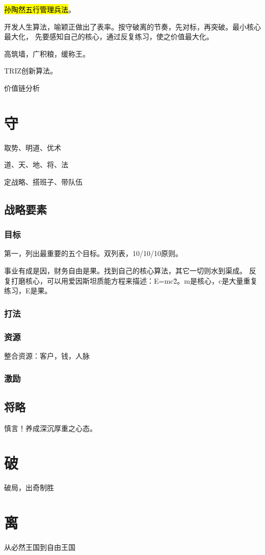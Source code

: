 \hl{孙陶然五行管理兵法}。

开发人生算法，喻颖正做出了表率。按守破离的节奏，先对标，再突破。最小核心最大化，
先要感知自己的核心，通过反复练习，使之价值最大化。

高筑墙，广积粮，缓称王。

TRIZ创新算法。

价值链分析

\section{守}

取势、明道、优术

道、天、地、将、法

定战略、搭班子、带队伍

\subsection{战略要素}

\subsubsection{目标}

第一，列出最重要的五个目标。双列表，10/10/10原则。

事业有成是因，财务自由是果。找到自己的核心算法，其它一切则水到渠成。
反复打磨核心，可以用爱因斯坦质能方程来描述：E=mc\^2。m是核心，c是大量重复练习，E是果。

\subsubsection{打法}

\subsubsection{资源}

整合资源：客户，钱，人脉

\subsubsection{激励}

\subsection{将略}

慎言！养成深沉厚重之心态。

\section{破}

破局，出奇制胜

\section{离}

从必然王国到自由王国
